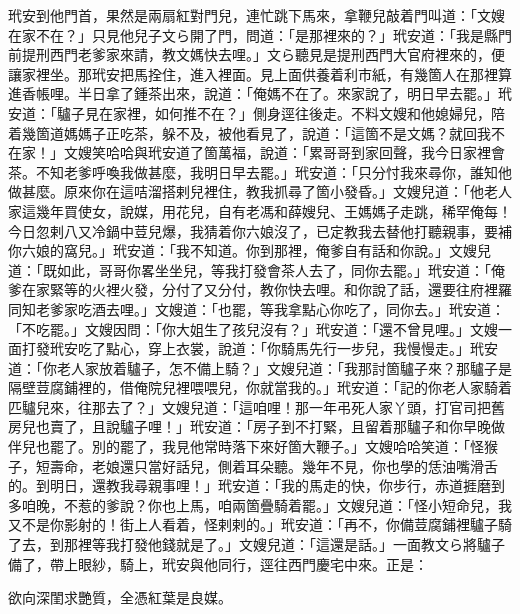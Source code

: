 玳安到他門首，果然是兩扇紅對門兒，連忙跳下馬來，拿鞭兒敲着門叫道：「文嫂在家不在？」只見他兒子文ら開了門，問道：「是那裡來的？」玳安道：「我是縣門前提刑西門老爹家來請，教文媽快去哩。」文ら聽見是提刑西門大官府裡來的，便讓家裡坐。那玳安把馬拴住，進入裡面。見上面供養着利市紙，有幾箇人在那裡算進香帳哩。半日拿了鍾茶出來，說道：「俺媽不在了。來家說了，明日早去罷。」玳安道：「驢子見在家裡，如何推不在？」{}側身逕往後走。不料文嫂和他媳婦兒，陪着幾箇道媽媽子正吃茶，躲不及，被他看見了，說道：「這箇不是文媽？就回我不在家！」文嫂笑哈哈與玳安道了箇萬福，說道：「累哥哥到家回聲，我今日家裡會茶。不知老爹呼喚我做甚麼，我明日早去罷。」玳安道：「只分忖我來尋你，誰知他做甚麼。原來你在這咭溜搭剌兒裡住，教我抓尋了箇小發昏。」文嫂兒道：「他老人家這幾年買使女，說媒，用花兒，自有老馮和薛嫂兒、王媽媽子走跳，稀罕俺每！今日忽剌八又冷鍋中荳兒爆，{}我猜着你六娘沒了，已定教我去替他打聽親事，要補你六娘的窩兒。」玳安道：「我不知道。你到那裡，俺爹自有話和你說。」文嫂兒道：「既如此，哥哥你畧坐坐兒，等我打發會茶人去了，同你去罷。」玳安道：「俺爹在家緊等的火裡火發，分付了又分付，教你快去哩。和你說了話，還要往府裡羅同知老爹家吃酒去哩。」文嫂道：「也罷，等我拿點心你吃了，同你去。」玳安道：「不吃罷。」文嫂因問：「你大姐生了孩兒沒有？」玳安道：「還不曾見哩。」文嫂一面打發玳安吃了點心，穿上衣裳，說道：「你騎馬先行一步兒，我慢慢走。」玳安道：「你老人家放着驢子，怎不備上騎？」文嫂兒道：「我那討箇驢子來？那驢子是隔壁荳腐鋪裡的，借俺院兒裡喂喂兒，你就當我的。」玳安道：「記的你老人家騎着匹驢兒來，往那去了？」文嫂兒道：「這咱哩！那一年弔死人家丫頭，打官司把舊房兒也賣了，且說驢子哩！」玳安道：「房子到不打緊，且留着那驢子和你早晚做伴兒也罷了。別的罷了，我見他常時落下來好箇大鞭子。」{}文嫂哈哈笑道：「怪猴子，短壽命，老娘還只當好話兒，側着耳朵聽。幾年不見，你也學的恁油嘴滑舌的。到明日，還教我尋親事哩！」玳安道：「我的馬走的快，你步行，赤道捱磨到多咱晚，不惹的爹說？你也上馬，咱兩箇疊騎着罷。」文嫂兒道：「怪小短命兒，我又不是你影射的！街上人看着，怪剌剌的。」玳安道：「再不，你備荳腐鋪裡驢子騎了去，到那裡等我打發他錢就是了。」文嫂兒道：「這還是話。」一面教文ら將驢子備了，帶上眼紗，騎上，玳安與他同行，逕往西門慶宅中來。正是：

\begin{myquote} 
欲向深閨求艷質，全憑紅葉是良媒。
\end{myquote} 

